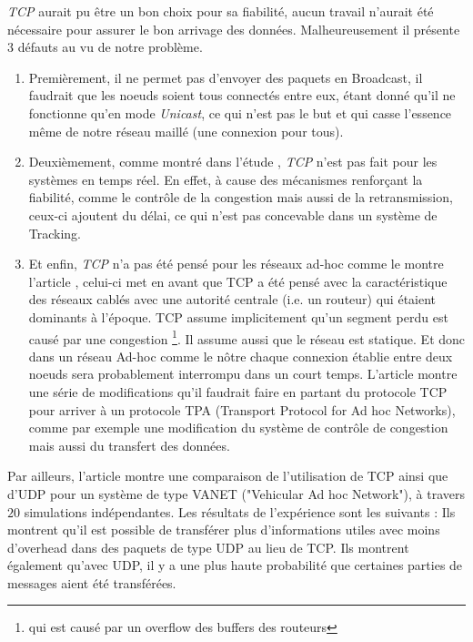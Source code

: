 \documentclass[journal, a4paper]{IEEEtran}
\begin{document}
        \textit{TCP} aurait pu être un bon choix pour sa fiabilité, aucun travail n'aurait été nécessaire pour assurer le bon arrivage des données. Malheureusement 
        il présente $3$ défauts au vu de notre problème.
        \begin{enumerate}
                \item Premièrement, il ne permet pas d'envoyer des paquets en Broadcast, il faudrait que les noeuds soient tous connectés entre eux, étant donné qu'il 
                ne fonctionne qu'en mode \textit{Unicast}, ce qui n'est pas le but et qui casse l'essence même de notre réseau maillé (une connexion pour tous).
                \item Deuxièmement, comme montré dans l'étude \cite{larzon1999efficient}, \textit{TCP} n'est pas fait pour les systèmes en temps réel. En effet, à cause des mécanismes renforçant la fiabilité, 
                comme le contrôle de la congestion mais aussi de la retransmission, ceux-ci ajoutent du délai, ce qui n'est pas concevable dans un système de Tracking.
                \item Et enfin, \textit{TCP} n'a pas été pensé pour les réseaux ad-hoc comme le montre l'article \cite{AnastasiGiuseppe2009DaPE}, celui-ci met en avant que TCP a été pensé avec la 
                caractéristique des réseaux cablés avec une autorité centrale (i.e. un routeur) qui étaient dominants à l'époque. TCP assume implicitement qu'un segment perdu est causé par une congestion \footnote{qui est causé par un overflow des buffers des 
                routeurs}. Il assume aussi que le réseau est statique. Et donc dans un réseau Ad-hoc comme le nôtre chaque connexion établie entre deux noeuds sera probablement interrompu dans 
                un court temps. L'article montre une série de modifications qu'il faudrait faire en partant du protocole TCP pour arriver à un protocole TPA (Transport Protocol for Ad hoc Networks), 
                comme par exemple une modification du système de contrôle de congestion mais aussi du transfert des données. \\
        \end{enumerate} 

        Par ailleurs, l'article \cite{BacaTomas2012OoMD} montre une comparaison de l'utilisation de TCP ainsi que d'UDP pour un système de type VANET ("Vehicular Ad hoc Network"), à travers $20$ simulations 
        indépendantes. Les résultats de l'expérience sont les suivants : Ils montrent qu'il est possible de transférer plus d'informations utiles avec moins d'overhead dans des paquets de type UDP 
        au lieu de TCP. Ils montrent également qu'avec UDP, il y a une plus haute probabilité que certaines parties de messages aient été transférées. \\
\end{document}
